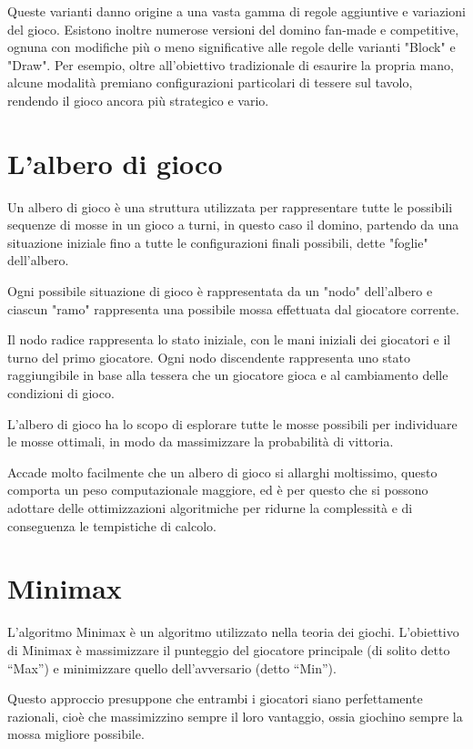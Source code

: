 \documentclass[a4paper,12pt]{report} %
\begin{document}
Queste varianti danno origine a una vasta gamma di regole aggiuntive e variazioni del gioco. Esistono inoltre numerose versioni del domino fan-made e competitive, ognuna con modifiche più o meno significative alle regole delle varianti "Block" e "Draw". Per esempio, oltre all’obiettivo tradizionale di esaurire la propria mano, alcune modalità premiano configurazioni particolari di tessere sul tavolo, rendendo il gioco ancora più strategico e vario.

\section{L'albero di gioco}

Un albero di gioco è una struttura utilizzata per rappresentare tutte le possibili sequenze di mosse in un gioco a turni, in questo caso il domino, partendo da una situazione iniziale fino a tutte le configurazioni finali possibili, dette "foglie" dell'albero. 

Ogni possibile situazione di gioco è rappresentata da un "nodo" dell'albero e ciascun "ramo" rappresenta una possibile mossa effettuata dal giocatore corrente.

Il nodo radice rappresenta lo stato iniziale, con le mani iniziali dei giocatori e il turno del primo giocatore. Ogni nodo discendente rappresenta uno stato raggiungibile in base alla tessera che un giocatore gioca e al cambiamento delle condizioni di gioco.

L’albero di gioco ha lo scopo di esplorare tutte le mosse possibili per individuare le mosse ottimali, in modo da massimizzare la probabilità di vittoria. 

Accade molto facilmente che un albero di gioco si allarghi moltissimo, questo comporta un peso computazionale maggiore, ed è per questo che si possono adottare delle ottimizzazioni algoritmiche per ridurne la complessità e di conseguenza le tempistiche di calcolo.

\section{Minimax}

L'algoritmo Minimax è un algoritmo utilizzato nella teoria dei giochi. L’obiettivo di Minimax è massimizzare il punteggio del giocatore principale (di solito detto “Max”) e minimizzare quello dell’avversario (detto “Min”). 

Questo approccio presuppone che entrambi i giocatori siano perfettamente razionali, cioè che massimizzino sempre il loro vantaggio, ossia giochino sempre la mossa migliore possibile.
\end{document}
